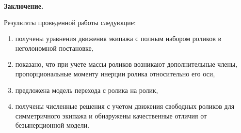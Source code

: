






%





{\bf Заключение.}

Результаты проведенной работы следующие:
\begin{enumerate}
    \item получены уравнения движения экипажа с полным набором роликов в неголономной постановке,

    \item показано, что при учете массы роликов возникают дополнительные члены, пропорциональные моменту инерции ролика относительно его оси,

    \item предложена модель перехода с ролика на ролик,

    \item получены численные решения с учетом движения свободных роликов для симметричного экипажа и обнаружены качественные отличия от безынерционной модели.
\end{enumerate}



% 














